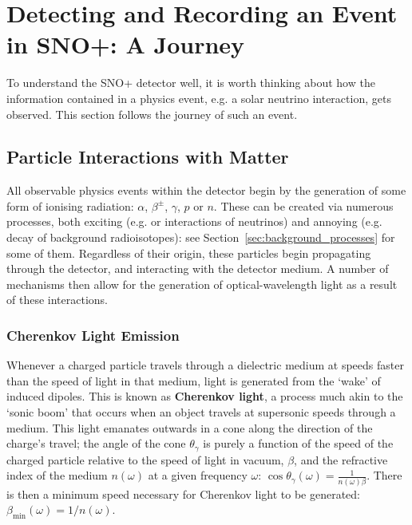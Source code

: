 \section{Detecting and Recording an Event in SNO+: A Journey}\label{sec:event_journey}
To understand the SNO+ detector well, it is worth thinking about how the information contained in a physics event, e.g. a solar neutrino interaction, gets observed. This section follows the journey of such an event.
\subsection{Particle Interactions with Matter}\label{sec:interactions_w_matter}
All observable physics events within the detector begin by the generation of some form of ionising radiation: $\alpha$, $\beta^{\pm}$, $\gamma$, $p$ or $n$. These can be created via numerous processes, both exciting (e.g. \onbb{} or interactions of neutrinos) and annoying (e.g. decay of background radioisotopes): see Section~\ref{sec:background_processes} for some of them. Regardless of their origin, these particles begin propagating through the detector, and interacting with the detector medium. A number of mechanisms then allow for the generation of optical-wavelength light as a result of these interactions.
\subsubsection{Cherenkov Light Emission}
Whenever a charged particle travels through a dielectric medium at speeds faster than the speed of light in that medium, light is generated from the `wake' of induced dipoles. This is known as \textbf{Cherenkov light}, a process much akin to the `sonic boom' that occurs when an object travels at supersonic speeds through a medium. This light emanates outwards in a cone along the direction of the charge's travel; the angle of the cone $\theta_{\gamma}$ is purely a function of the speed of the charged particle relative to the speed of light in vacuum, $\beta$, and the refractive index of the medium $n(\omega)$ at a given frequency $\omega$: $\cos{\theta_{\gamma}}(\omega) = \frac{1}{n(\omega)\beta}$. There is then a minimum speed necessary for Cherenkov light to be generated: $\beta_{\textrm{min}}(\omega) = 1/n(\omega)$.


